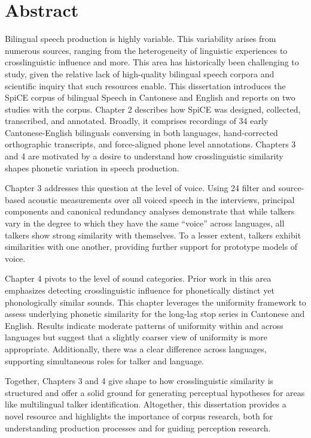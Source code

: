 
\chapter{Abstract}

Bilingual speech production is highly variable. This variability arises from numerous sources, ranging from the heterogeneity of linguistic experiences to crosslinguistic influence and more. This area has historically been challenging to study, given the relative lack of high-quality bilingual speech corpora and scientific inquiry that such resources enable. This dissertation introduces the SpiCE corpus of bilingual Speech in Cantonese and English and reports on two studies with the corpus. Chapter 2 describes how SpiCE was designed, collected, transcribed, and annotated. Broadly, it comprises recordings of 34 early Cantonese-English bilinguals conversing in both languages, hand-corrected orthographic transcripts, and force-aligned phone level annotations. Chapters 3 and 4 are motivated by a desire to understand how crosslinguistic similarity shapes phonetic variation in speech production.

Chapter 3 addresses this question at the level of voice. Using 24 filter and source-based acoustic measurements over all voiced speech in the interviews, principal components and canonical redundancy analyses demonstrate that while talkers vary in the degree to which they have the same ``voice'' across languages, all talkers show strong similarity with themselves. To a lesser extent, talkers exhibit similarities with one another, providing further support for prototype models of voice. 

Chapter 4 pivots to the level of sound categories. Prior work in this area emphasizes detecting crosslinguistic influence for phonetically distinct yet phonologically similar sounds. This chapter leverages the uniformity framework to assess underlying phonetic similarity for the long-lag stop series in Cantonese and English.  Results indicate moderate patterns of uniformity within and across languages but suggest that a slightly coarser view of uniformity is more appropriate. Additionally, there was a clear difference across languages, supporting simultaneous roles for talker and language. 

Together, Chapters 3 and 4 give shape to how crosslinguistic similarity is structured and offer a solid ground for generating perceptual hypotheses for areas like multilingual talker identification. Altogether, this dissertation provides a novel resource and highlights the importance of corpus research, both for understanding production processes and for guiding perception research.


\endinput %
